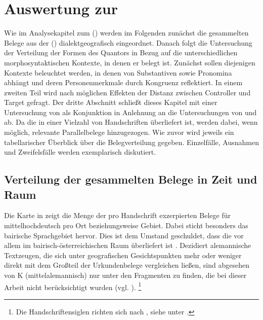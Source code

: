 \chapter{Auswertung zur }
\label{ch:kcanalyse}

Wie im Analysekapitel zum  (\CAO)
werden im Folgenden zunächst die gesammelten Belege aus der 
(\KC{}) dialektgeografisch eingeordnet. Danach folgt die Untersuchung der
Verteilung der Formen des Quantors   in Bezug auf die
unterschiedlichen morphosyntaktischen Kontexte, in denen er belegt ist.
Zunächst sollen diejenigen Kontexte beleuchtet werden, in denen 
von Substantiven sowie Pronomina abhängt und deren Personenmerkmale durch
Kongruenz reflektiert. In einem zweiten Teil wird nach möglichen Effekten der
Distanz zwischen Controller und Target gefragt. Der dritte Abschnitt schließt
dieses Kapitel mit einer Untersuchung von  als Konjunktion in
Anlehnung an die Untersuchungen von \citet{askedal1974} und
\citet{gjelsten1980} ab. Da die \KC{} in einer Vielzahl von Handschriften
überliefert ist, werden dabei, wenn möglich, relevante Parallelbelege
hinzugezogen. Wie zuvor wird jeweils ein tabellarischer Überblick über die
Belegverteilung gegeben. Einzelfälle, Ausnahmen und Zweifelsfälle werden
exemplarisch diskutiert.

\section{Verteilung der gesammelten Belege in Zeit und Raum}
\label{subsec:beiddispmap}


Die Karte in  zeigt die Menge der pro Handschrift
exzerpierten Belege für mittelhochdeutsch  pro Ort beziehungsweise
Gebiet. Dabei sticht besonders das bairische Sprachgebiet hervor.
Dies ist dem Umstand geschuldet, dass die \KC{} vor allem im
bairisch-österreichischen Raum überliefert ist
\autocite{klein1988}. Dezidiert alemannische
Textzeugen, die sich unter geografischen Gesichtspunkten
mehr oder weniger direkt mit dem Großteil der Urkundenbelege vergleichen
ließen, sind abgesehen von K (mittelalemannisch) nur unter den
Fragmenten zu finden, die bei dieser Arbeit nicht berücksichtigt wurden (vgl.
).%
%
	\footnote{Die Handschriftensiglen richten sich nach ,
		siehe unter .%
	}

